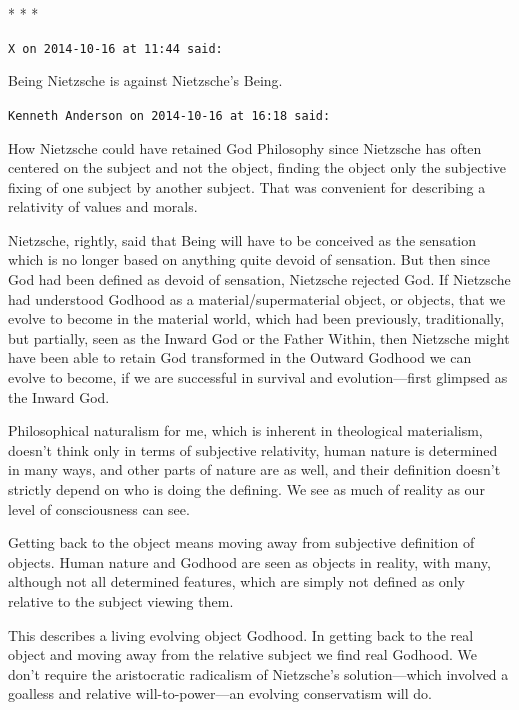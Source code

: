 
\begin{center}* * *\end{center}

\begin{footnotesize}
\begin{sffamily}
\texttt{X on 2014-10-16 at 11:44 said:}

Being Nietzsche is against Nietzsche's Being.

\hfill

\texttt{Kenneth Anderson on 2014-10-16 at 16:18 said:}

How Nietzsche could have retained God Philosophy since Nietzsche has often centered on the subject and not the object, finding the object only the subjective fixing of one subject by another subject. That was convenient for describing a relativity of values and morals.

Nietzsche, rightly, said that Being will have to be conceived as the sensation which is no longer based on anything quite devoid of sensation. But then since God had been defined as devoid of sensation, Nietzsche rejected God. If Nietzsche had understood Godhood as a material/supermaterial object, or objects, that we evolve to become in the material world, which had been previously, traditionally, but partially, seen as the Inward God or the Father Within, then Nietzsche might have been able to retain God transformed in the Outward Godhood we can evolve to become, if we are successful in survival and evolution---first glimpsed as the Inward God.

Philosophical naturalism for me, which is inherent in theological materialism, doesn't think only in terms of subjective relativity, human nature is determined in many ways, and other parts of nature are as well, and their definition doesn't strictly depend on who is doing the defining. We see as much of reality as our level of consciousness can see.

Getting back to the object means moving away from subjective definition of objects. Human nature and Godhood are seen as objects in reality, with many, although not all determined features, which are simply not defined as only relative to the subject viewing them.

This describes a living evolving object Godhood. In getting back to the real object and moving away from the relative subject we find real Godhood. We don't require the aristocratic radicalism of Nietzsche's solution---which involved a goalless and relative will-to-power---an evolving conservatism will do.


\end{sffamily}
\end{footnotesize}
